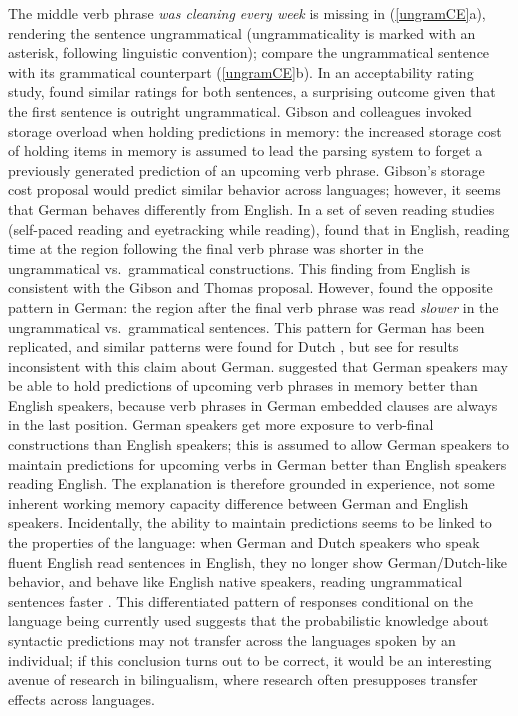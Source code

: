 \documentclass{cambridge7A}\usepackage[]{graphicx}\usepackage[]{color}
\begin{document}
The middle verb phrase \textit{was cleaning every week} is missing in
(\ref{ungramCE}a), rendering the sentence ungrammatical
(ungrammaticality is marked with an asterisk, following linguistic
convention); compare the ungrammatical sentence with its grammatical
counterpart (\ref{ungramCE}b).  In an acceptability rating study,
\cite{gibsonthomas97} found similar ratings for both sentences, a
surprising outcome given that the first sentence is outright
ungrammatical. Gibson and colleagues invoked storage overload when
holding predictions in memory: the increased storage cost of holding items 
in memory is assumed to lead the parsing system to forget a previously generated prediction of an upcoming verb phrase. 
Gibson's storage cost proposal would predict similar behavior
across languages; however, it seems that German behaves differently
from English. In a set of seven reading studies (self-paced reading
and eyetracking while reading), \cite{VasishthSuckowLewis2010} found
that in English, reading time at the region following the final verb
phrase was shorter in the ungrammatical vs.\ grammatical
constructions. This finding from English is consistent with the Gibson and Thomas
proposal. However, \cite{VasishthSuckowLewis2010} found the opposite
pattern in German: the region after the final verb phrase was read
\textit{slower} in the ungrammatical vs.\ grammatical sentences. This
pattern for German has been replicated, and similar patterns were
found for Dutch \citep{FrankTrompenaarsVasishth2015}, but see
\cite{bader2016complex} for results inconsistent with this claim about
German. \cite{VasishthSuckowLewis2010} suggested that German speakers
may be able to hold predictions of upcoming verb phrases in memory
better than English speakers, because verb phrases in German embedded  
clauses are always in the last position. German speakers get more exposure to verb-final constructions than English speakers; this is assumed to allow German speakers to maintain predictions for upcoming verbs in German better than English speakers reading English. The explanation is therefore grounded in experience, not some inherent working memory capacity difference between German and English speakers. Incidentally, the ability to maintain predictions seems to be linked to the properties of the language: when German and Dutch speakers who speak fluent English read sentences in English, they no longer show German/Dutch-like behavior, and behave like English native speakers, reading ungrammatical sentences faster 
\citep{FrankTrompenaarsVasishth2015}. This differentiated pattern of responses conditional on the language being currently used suggests that the  probabilistic knowledge about syntactic predictions may not transfer across the languages spoken by an individual; if this conclusion turns out to be correct, it would be an interesting avenue of research in bilingualism, where research often presupposes  transfer effects across languages. 
\end{document}
